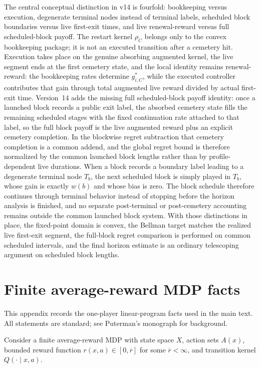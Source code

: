 \documentclass[12pt]{article}
\theoremstyle{definition}
\newcommand{\1}{\mathbf{1}}
\begin{document}
The central conceptual distinction in v14 is fourfold: bookkeeping versus
execution, degenerate terminal nodes instead of terminal labels, scheduled block
boundaries versus live first-exit times, and live renewal-reward versus full
scheduled-block payoff. The restart kernel $\rho_C$ belongs only to the convex
bookkeeping package; it is not an executed transition after a cemetery hit.
Execution takes place on the genuine absorbing augmented kernel, the live segment
ends at the first cemetery state, and the local identity remains renewal-reward:
the bookkeeping rates determine $g_{i,C}^*$, while the executed controller
contributes that gain through total augmented live reward divided by actual
first-exit time. Version~14 adds the missing full scheduled-block payoff
identity: once a launched block records a public exit label, the absorbed
cemetery state fills the remaining scheduled stages with the fixed continuation
rate attached to that label, so the full block payoff is the live augmented
reward plus an explicit cemetery completion. In the blockwise regret
subtraction that cemetery completion is a common addend, and the global regret
bound is therefore normalized by the common launched block lengths rather than by
profile-dependent live durations. When a block records a boundary label leading
to a degenerate terminal node $T_b$, the next scheduled block is simply played in
$T_b$, whose gain is exactly $w(b)$ and whose bias is zero. The block schedule
therefore continues through terminal behavior instead of stopping before the
horizon analysis is finished, and no separate post-terminal or post-cemetery
accounting remains outside the common launched block system. With those
distinctions in place, the fixed-point domain is convex, the Bellman target
matches the realized live first-exit segment, the full-block regret comparison is
performed on common scheduled intervals, and the final horizon estimate is an
ordinary telescoping argument on scheduled block lengths.

\appendix


\section{Finite average-reward MDP facts}
\label{app:mdp}

This appendix records the one-player linear-program facts used in the main text.
All statements are standard; see Puterman's monograph \cite{Puterman1994} for
background.

Consider a finite average-reward MDP with state space $X$, action sets $A(x)$,
bounded reward function $r(x,a)\in[0,\overline r]$ for some $\overline r<\infty$,
and transition kernel $Q(\cdot\mid x,a)$.
\end{document}
